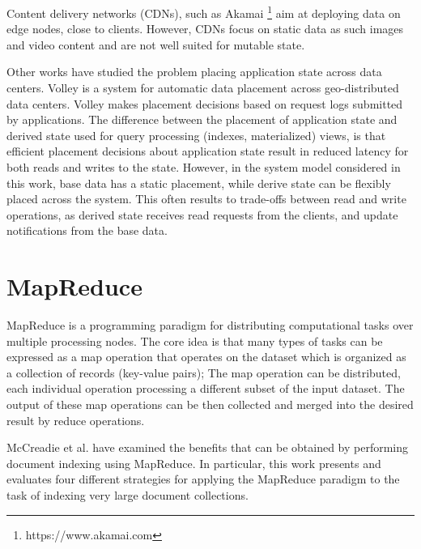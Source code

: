 Content delivery networks (CDNs), such as Akamai \footnote{https://www.akamai.com} aim at deploying data on edge nodes,
close to clients.
However, CDNs focus on static data as such images and video content and are not well suited for mutable state.

Other works have studied the problem placing application state across data centers.
Volley \cite{agarwal:volley} is a system for automatic data placement across geo-distributed data centers.
Volley makes placement decisions based on request logs submitted by applications.
The difference between the placement of application state and derived state used for query processing (indexes, materialized)
views, is that efficient placement decisions about application state result in reduced latency for both reads and writes
to the state.
However, in the system model considered in this work, base data has a static placement,
while derive state can be flexibly placed across the system.
This often results to trade-offs between read and write operations,
as derived state receives read requests from the clients, and update notifications from the base data.

\section{MapReduce}
\label{sec:mapreduce}
MapReduce \cite{dean:mapreduce} is a programming paradigm for distributing computational tasks over multiple processing nodes.
The core idea is that many types of tasks can be expressed as a map operation that operates on the dataset which is organized
as a collection of records (key-value pairs);
The map operation can be distributed, each individual operation processing a different subset of the input dataset.
The output of these map operations can be then collected and merged into the desired result by reduce operations.

McCreadie et al. \cite{mccreadie:mapreduceindexing} have examined the benefits that can be obtained by performing document
indexing using MapReduce.
In particular, this work presents and evaluates four different strategies for applying the MapReduce paradigm
to the task of indexing very large document collections.

